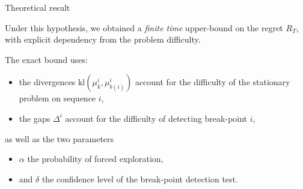\documentclass[11pt,english,ignorenonframetext,]{beamer}
\begin{document}
\begin{frame}{Theoretical result}

  Under this hypothesis, we obtained a \emph{finite time}
  upper-bound on the regret $R_T$,
  with explicit dependency from the problem difficulty.

  The exact bound uses:
  \begin{itemize}
    \item
    the divergences $\mathrm{kl}(\mu_{k}^{i},\mu_{b(i)}^{i})$
    account for the difficulty of the stationary problem on sequence $i$,
    \item
    the gaps $\Delta^{i}$
    account for the difficulty of detecting break-point $i$,
  \end{itemize}
  as well as the two parameters
  \begin{itemize}
    \item
    $\alpha$ the probability of forced exploration,
    \item
    and $\delta$ the confidence level of the break-point detection test.
  \end{itemize}

\end{frame}
\end{document}
